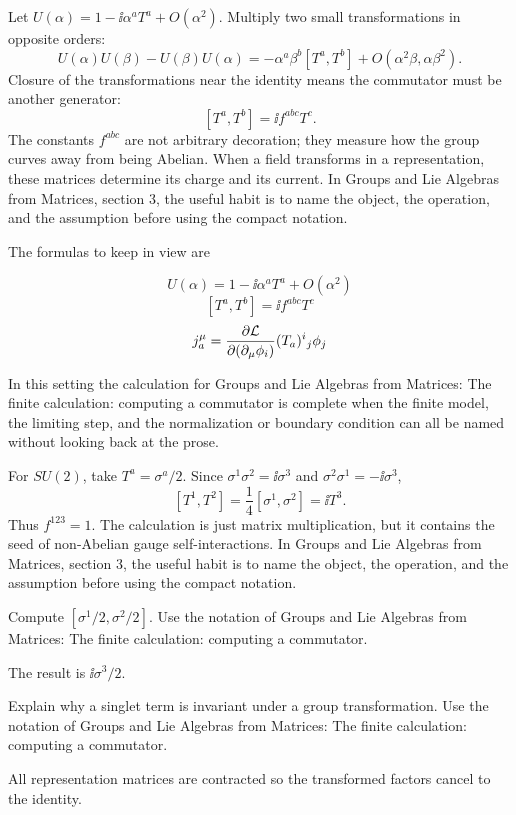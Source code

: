 Let \(U(\alpha)=1-\ii\alpha^aT^a+O(\alpha^2)\).  Multiply two small transformations in opposite orders:
\[
  U(\alpha)U(\beta)-U(\beta)U(\alpha)
  =
  -\alpha^a\beta^b[T^a,T^b]+O(\alpha^2\beta,\alpha\beta^2).
\]
Closure of the transformations near the identity means the commutator must be another generator:
\[
  [T^a,T^b]=\ii f^{abc}T^c.
\]
The constants \(f^{abc}\) are not arbitrary decoration; they measure how the group curves away from being Abelian.  When a field transforms in a representation, these matrices determine its charge and its current.  In Groups and Lie Algebras from Matrices, section 3, the useful habit is to name the object, the operation, and the assumption before using the compact notation.

The formulas to keep in view are

\[
  U(\alpha)=1-\ii\alpha^aT^a+O(\alpha^2)
\]
\[
  [T^a,T^b]=\ii f^{abc}T^c
\]
\[
  j^\mu_a=\frac{\partial\mathcal L}{\partial(\partial_\mu\phi_i)}(T_a)^i{}_j\phi_j
\]

In this setting the calculation for Groups and Lie Algebras from Matrices: The finite calculation: computing a commutator is complete when the finite model, the limiting step, and the normalization or boundary condition can all be named without looking back at the prose.




\begin{example}
For \(SU(2)\), take \(T^a=\sigma^a/2\).  Since \(\sigma^1\sigma^2=\ii\sigma^3\) and \(\sigma^2\sigma^1=-\ii\sigma^3\),
\[
  [T^1,T^2]=\frac14[\sigma^1,\sigma^2]=\ii T^3.
\]
Thus \(f^{123}=1\).  The calculation is just matrix multiplication, but it contains the seed of non-Abelian gauge self-interactions.  In Groups and Lie Algebras from Matrices, section 3, the useful habit is to name the object, the operation, and the assumption before using the compact notation.
\end{example}



\begin{exercise}
Compute \([\sigma^1/2,\sigma^2/2]\).  Use the notation of Groups and Lie Algebras from Matrices: The finite calculation: computing a commutator.
\begin{answer}
The result is \(\ii\sigma^3/2\).
\end{answer}
\end{exercise}

\begin{exercise}
Explain why a singlet term is invariant under a group transformation.  Use the notation of Groups and Lie Algebras from Matrices: The finite calculation: computing a commutator.
\begin{answer}
All representation matrices are contracted so the transformed factors cancel to the identity.
\end{answer}
\end{exercise}



